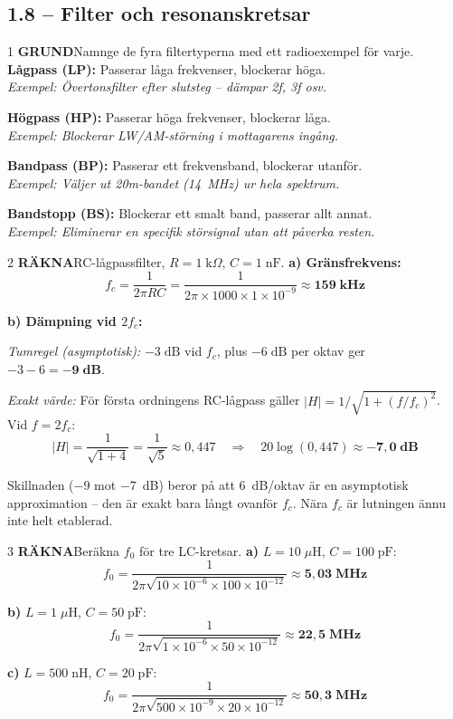 \documentclass[a4paper,11pt,twoside]{book}
\newcommand{\qgrund}{\colorbox{greenpale}{\textcolor{greendark}{\headingfont\bfseries\tiny GRUND}}}
\newcommand{\qrakna}{\colorbox{bluepale}{\textcolor{bluedark}{\headingfont\bfseries\tiny RÄKNA}}}
\begin{document}
\subsection*{1.8 – Filter och resonanskretsar}

\begin{facitblock}{1}
\qgrund\quad Namnge de fyra filtertyperna med ett radioexempel för varje.
\tcblower
\textbf{Lågpass (LP):} Passerar låga frekvenser, blockerar höga.\\
\textit{Exempel: Övertonsfilter efter slutsteg -- dämpar 2f, 3f osv.}

\textbf{Högpass (HP):} Passerar höga frekvenser, blockerar låga.\\
\textit{Exempel: Blockerar LW/AM-störning i mottagarens ingång.}

\textbf{Bandpass (BP):} Passerar ett frekvensband, blockerar utanför.\\
\textit{Exempel: Väljer ut 20m-bandet (14~MHz) ur hela spektrum.}

\textbf{Bandstopp (BS):} Blockerar ett smalt band, passerar allt annat.\\
\textit{Exempel: Eliminerar en specifik störsignal utan att påverka resten.}
\end{facitblock}

\begin{facitblock}{2}
\qrakna\quad RC-lågpassfilter, $R=1\;\text{k}\Omega$, $C=1\;\text{nF}$.
\tcblower
\textbf{a) Gränsfrekvens:}
\[
f_c = \frac{1}{2\pi RC}
    = \frac{1}{2\pi \times 1000 \times 1\times10^{-9}}
    \approx \mathbf{159\;\text{kHz}}
\]

\textbf{b) Dämpning vid $2f_c$:}

\textit{Tumregel (asymptotisk):} $-3\;\text{dB}$ vid $f_c$, plus
$-6\;\text{dB}$ per oktav ger $-3 - 6 = \mathbf{-9\;\text{dB}}$.

\textit{Exakt värde:} För första ordningens RC-lågpass gäller
$|H| = 1/\sqrt{1+(f/f_c)^2}$. Vid $f = 2f_c$:
\[
|H| = \frac{1}{\sqrt{1+4}} = \frac{1}{\sqrt{5}} \approx 0{,}447
\quad\Rightarrow\quad
20\log(0{,}447) \approx \mathbf{-7{,}0\;\text{dB}}
\]

Skillnaden ($-9$ mot $-7$~dB) beror på att 6~dB/oktav är en
asymptotisk approximation -- den är exakt bara långt ovanför $f_c$.
Nära $f_c$ är lutningen ännu inte helt etablerad.
\end{facitblock}

\begin{facitblock}{3}
\qrakna\quad Beräkna $f_0$ för tre LC-kretsar.
\tcblower
\textbf{a)} $L=10\;\mu\text{H}$, $C=100\;\text{pF}$:
\[
f_0 = \frac{1}{2\pi\sqrt{10\times10^{-6}\times100\times10^{-12}}}
    \approx \mathbf{5{,}03\;\text{MHz}}
\]

\textbf{b)} $L=1\;\mu\text{H}$, $C=50\;\text{pF}$:
\[
f_0 = \frac{1}{2\pi\sqrt{1\times10^{-6}\times50\times10^{-12}}}
    \approx \mathbf{22{,}5\;\text{MHz}}
\]

\textbf{c)} $L=500\;\text{nH}$, $C=20\;\text{pF}$:
\[
f_0 = \frac{1}{2\pi\sqrt{500\times10^{-9}\times20\times10^{-12}}}
    \approx \mathbf{50{,}3\;\text{MHz}}
\]
\end{facitblock}
\end{document}
